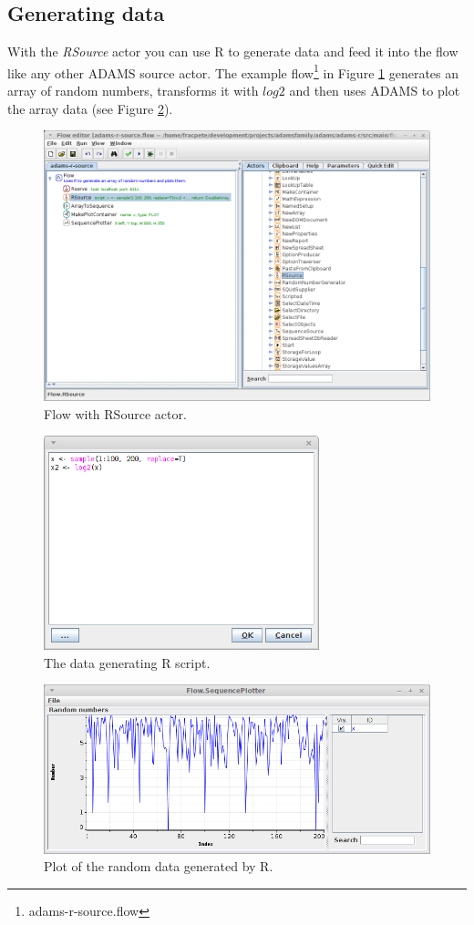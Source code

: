 \documentclass[a4paper]{book}
\begin{document}
\subsection{Generating data}
With the \textit{RSource} actor you can use R to generate data and feed it
into the flow like any other ADAMS source actor. The example 
flow\footnote{adams-r-source.flow} in Figure \ref{source-flow} generates
an array of random numbers, transforms it with $log2$ and then uses ADAMS
to plot the array data (see Figure \ref{source-script}).
\begin{figure}[ht]
	\centering
	\includegraphics[width=\textwidth]{images/source-flow.png}
	\caption{Flow with RSource actor.}
	\label{source-flow}
\end{figure}
\begin{figure}[ht]
	\centering
	\includegraphics[width=8cm]{images/source-script.png}
	\caption{The data generating R script.}
	\label{source-script}
\end{figure}
\begin{figure}[ht]
	\centering
	\includegraphics[width=\textwidth]{images/source-output.png}
	\caption{Plot of the random data generated by R.}
	\label{source-output}
\end{figure}
\end{document}
